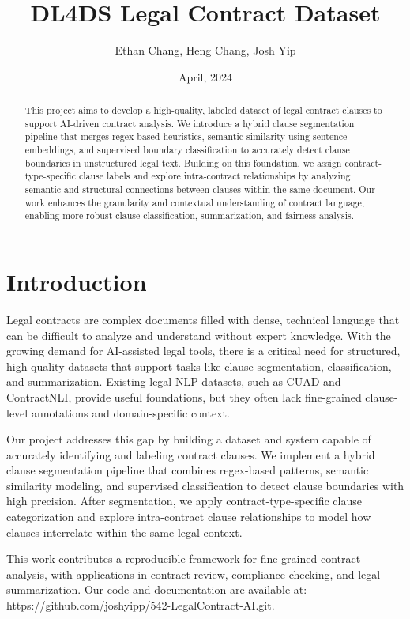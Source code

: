\documentclass[11pt, oneside]{article}   	%
\title{DL4DS Legal Contract Dataset}
\author{Ethan Chang, Heng Chang, Josh Yip}
\date{April, 2024}		%
\begin{document}
\maketitle
\begin{abstract}
	This project aims to develop a high-quality, labeled dataset of legal contract clauses to support AI-driven contract analysis. We introduce a hybrid clause segmentation pipeline that merges regex-based heuristics, semantic similarity using sentence embeddings, and supervised boundary classification to accurately detect clause boundaries in unstructured legal text. Building on this foundation, we assign contract-type-specific clause labels and explore intra-contract relationships by analyzing semantic and structural connections between clauses within the same document. Our work enhances the granularity and contextual understanding of contract language, enabling more robust clause classification, summarization, and fairness analysis.
\end{abstract}

\section*{Introduction}

Legal contracts are complex documents filled with dense, technical language that can be difficult to analyze and understand without expert knowledge. With the growing demand for AI-assisted legal tools, there is a critical need for structured, high-quality datasets that support tasks like clause segmentation, classification, and summarization. Existing legal NLP datasets, such as CUAD and ContractNLI, provide useful foundations, but they often lack fine-grained clause-level annotations and domain-specific context.

Our project addresses this gap by building a dataset and system capable of accurately identifying and labeling contract clauses. We implement a hybrid clause segmentation pipeline that combines regex-based patterns, semantic similarity modeling, and supervised classification to detect clause boundaries with high precision. After segmentation, we apply contract-type-specific clause categorization and explore intra-contract clause relationships to model how clauses interrelate within the same legal context.

This work contributes a reproducible framework for fine-grained contract analysis, with applications in contract review, compliance checking, and legal summarization. Our code and documentation are available at:
https://github.com/joshyipp/542-LegalContract-AI.git.
\end{document}
